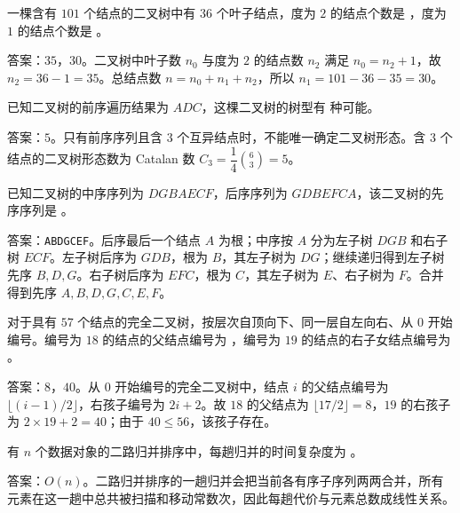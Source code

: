 \begin{question}
一棵含有 $101$ 个结点的二叉树中有 $36$ 个叶子结点，度为 $2$ 的结点个数是 \blank，度为 $1$ 的结点个数是 \blank。
\begin{solution}
答案：$35$，$30$。二叉树中叶子数 $n_0$ 与度为 $2$ 的结点数 $n_2$ 满足 $n_0=n_2+1$，故 $n_2=36-1=35$。总结点数 $n=n_0+n_1+n_2$，所以 $n_1=101-36-35=30$。
\end{solution}
\end{question}

\begin{question}
已知二叉树的前序遍历结果为 $ADC$，这棵二叉树的树型有 \blank 种可能。
\begin{solution}
答案：$5$。只有前序序列且含 $3$ 个互异结点时，不能唯一确定二叉树形态。含 $3$ 个结点的二叉树形态数为 Catalan 数 $C_3=\dfrac{1}{4}\binom{6}{3}=5$。
\end{solution}
\end{question}

\begin{question}
已知二叉树的中序序列为 $DGBAECF$，后序序列为 $GDBEFCA$，该二叉树的先序序列是 \blank。
\begin{solution}
答案：\texttt{ABDGCEF}。后序最后一个结点 $A$ 为根；中序按 $A$ 分为左子树 $DGB$ 和右子树 $ECF$。左子树后序为 $GDB$，根为 $B$，其左子树为 $DG$；继续递归得到左子树先序 $B,D,G$。右子树后序为 $EFC$，根为 $C$，其左子树为 $E$、右子树为 $F$。合并得到先序 $A,B,D,G,C,E,F$。
\end{solution}
\end{question}

\begin{question}
对于具有 $57$ 个结点的完全二叉树，按层次自顶向下、同一层自左向右、从 $0$ 开始编号。编号为 $18$ 的结点的父结点编号为 \blank，编号为 $19$ 的结点的右子女结点编号为 \blank。
\begin{solution}
答案：$8$，$40$。从 $0$ 开始编号的完全二叉树中，结点 $i$ 的父结点编号为 $\lfloor(i-1)/2\rfloor$，右孩子编号为 $2i+2$。故 $18$ 的父结点为 $\lfloor17/2\rfloor=8$，$19$ 的右孩子为 $2\times19+2=40$；由于 $40\le 56$，该孩子存在。
\end{solution}
\end{question}

\begin{question}
有 $n$ 个数据对象的二路归并排序中，每趟归并的时间复杂度为 \blank。
\begin{solution}
答案：$O(n)$。二路归并排序的一趟归并会把当前各有序子序列两两合并，所有元素在这一趟中总共被扫描和移动常数次，因此每趟代价与元素总数成线性关系。
\end{solution}
\end{question}

